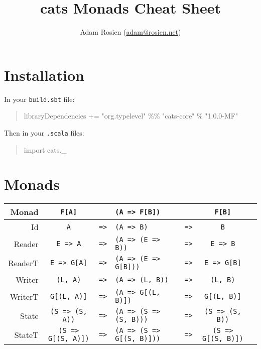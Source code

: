 \documentclass{tufte-handout}
\title{cats Monads Cheat Sheet}
\author[Adam Rosien]{Adam Rosien (\href{mailto:adam@rosien.net}{adam@rosien.net})}
\newcommand{\fa}{F[A]}
\newcommand{\fb}{F[B]}
\newcommand{\rarr}{\texttt{=>}}
\newcommand{\fThree}[3]{\texttt{#1} & \rarr & \texttt{#2} & \rarr & \texttt{#3}}
\begin{document}
\maketitle%

\section{Installation}\label{sec:installation}

\noindent In your \texttt{build.sbt} file:

\begin{quote}
  \ttfamily libraryDependencies += "org.typelevel" \%\% "cats-core" \% "1.0.0-MF"
\end{quote}

\noindent Then in your \texttt{.scala} files:

\begin{quote}
  \ttfamily import cats.\_
\end{quote}

\section{Monads}

\begin{table}[ht]
  \centering
  \selectfont
  \setlength{\tabcolsep}{5pt}
  \begin{tabular}{rcrlccl}
    Monad & \texttt{\fa} &  & \texttt{(A => \fb)} & & \texttt{\fb} \\
    \midrule
    Id               & \fThree{A}{(A => B)}{B} \\
    Reader      & \fThree{E => A}{(A => (E => B))}{E => B} \\
    ReaderT      & \fThree{E => G[A]}{(A => (E => G[B]))}{E => G[B]} \\
    Writer        & \fThree{(L, A)}{(A => (L, B))}{(L, B)} \\    
    WriterT        & \fThree{G[(L, A)]}{(A => G[(L, B)])}{G[(L, B)]} \\    
    State         & \fThree{(S =>  (S, A))}{(A => (S => (S, B)))}{(S => (S, B))} \\   \
    StateT         & \fThree{(S =>  G[(S, A)])}{(A => (S => G[(S, B)]))}{(S => G[(S, B)])} \\   

  \end{tabular}
  \label{tab:normaltab}
\end{table}




\end{document}
